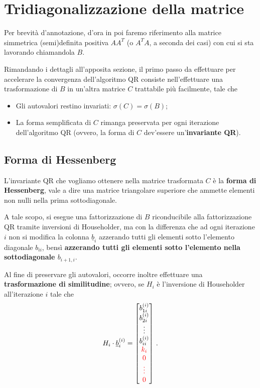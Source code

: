 \section{Tridiagonalizzazione della matrice}
Per brevità d'annotazione, d'ora in poi faremo riferimento alla matrice 
simmetrica (semi)definita positiva $A A^T$ (o $A^T A$, a seconda dei casi) con 
cui si sta lavorando chiamandola $B$.

Rimandando i dettagli all'apposita sezione, il primo passo da effettuare per 
accelerare la convergenza dell'algoritmo QR consiste nell'effettuare una 
trasformazione di $B$ in un'altra matrice $C$ trattabile più facilmente, tale 
che
\begin{itemize}
	\item Gli autovalori restino invariati: $\sigma(C) = \sigma(B)$;
	
	\item La forma semplificata di $C$ rimanga preservata per ogni iterazione 
dell'algoritmo QR (ovvero, la forma di $C$ dev'essere un'\textbf{invariante 
QR}).
\end{itemize}

\subsection{Forma di Hessenberg}
L'invariante QR che vogliamo ottenere nella matrice trasformata $C$ è la 
\textbf{forma di Hessenberg}, vale a dire una matrice triangolare superiore che 
ammette elementi non nulli nella prima sottodiagonale.

A tale scopo, si esegue una fattorizzazione di $B$ riconducibile alla 
fattorizzazione QR tramite inversioni di Householder, ma con la differenza che 
ad ogni iterazione $i$ non si modifica la colonna $\underline{b}_i$ azzerando 
tutti gli elementi sotto l'elemento diagonale $b_{ii}$, bensì \textbf{azzerando 
tutti gli elementi sotto l'elemento nella sottodiagonale $b_{i+1,i}$}.

Al fine di preservare gli autovalori, occorre inoltre effettuare una 
\textbf{trasformazione di similitudine}; ovvero, se $H_i$ è l'inversione di 
Householder all'iterazione $i$ tale che
\begin{equation}\label{householder_iteration}
H_i \cdot \underline{b}_{i}^{(i)} = 
\begin{bmatrix}
	b_{1i}^{(i)} \\
	b_{2i}^{(i)} \\
	\vdots \\
	b_{ii}^{(i)} \\ 
	\textcolor{red}{k_i} \\
	\textcolor{red}{0} \\ 
	\textcolor{red}{\vdots} \\ 
	\textcolor{red}{0}
\end{bmatrix}
\,.
\end{equation}

